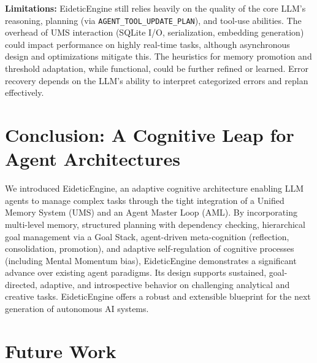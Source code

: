 \documentclass[12pt,a4paper]{article}
\newcommand{\code}[1]{\nolinkurl{#1}}
\begin{document}
\textbf{Limitations:} EideticEngine still relies heavily on the quality of the core LLM's reasoning, planning (via \code{AGENT\_TOOL\_UPDATE\_PLAN}), and tool-use abilities. The overhead of UMS interaction (SQLite I/O, serialization, embedding generation) could impact performance on highly real-time tasks, although asynchronous design and optimizations mitigate this. The heuristics for memory promotion and threshold adaptation, while functional, could be further refined or learned. Error recovery depends on the LLM's ability to interpret categorized errors and replan effectively.

\section{Conclusion: A Cognitive Leap for Agent Architectures}

We introduced EideticEngine, an adaptive cognitive architecture enabling LLM agents to manage complex tasks through the tight integration of a Unified Memory System (UMS) and an Agent Master Loop (AML). By incorporating multi-level memory, structured planning with dependency checking, hierarchical goal management via a Goal Stack, agent-driven meta-cognition (reflection, consolidation, promotion), and adaptive self-regulation of cognitive processes (including Mental Momentum bias), EideticEngine demonstrates a significant advance over existing agent paradigms. Its design supports sustained, goal-directed, adaptive, and introspective behavior on challenging analytical and creative tasks. EideticEngine offers a robust and extensible blueprint for the next generation of autonomous AI systems.

\section{Future Work}
\end{document}
